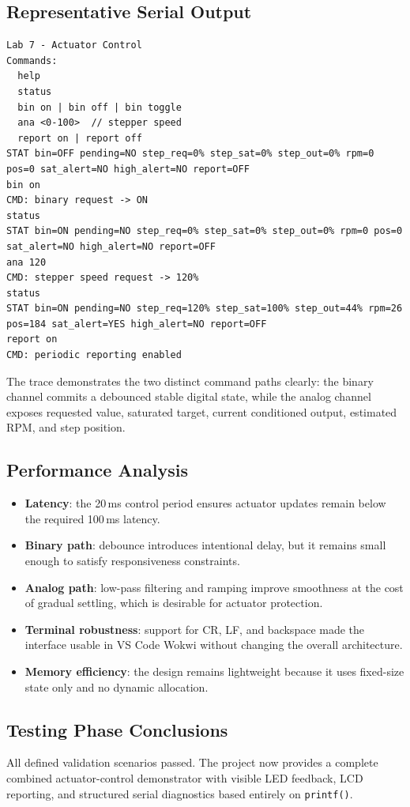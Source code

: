 \documentclass[12pt]{article}
\begin{document}
\subsection{Representative Serial Output}
\begin{verbatim}
Lab 7 - Actuator Control
Commands:
  help
  status
  bin on | bin off | bin toggle
  ana <0-100>  // stepper speed
  report on | report off
STAT bin=OFF pending=NO step_req=0% step_sat=0% step_out=0% rpm=0 pos=0 sat_alert=NO high_alert=NO report=OFF
bin on
CMD: binary request -> ON
status
STAT bin=ON pending=NO step_req=0% step_sat=0% step_out=0% rpm=0 pos=0 sat_alert=NO high_alert=NO report=OFF
ana 120
CMD: stepper speed request -> 120%
status
STAT bin=ON pending=NO step_req=120% step_sat=100% step_out=44% rpm=26 pos=184 sat_alert=YES high_alert=NO report=OFF
report on
CMD: periodic reporting enabled
\end{verbatim}

The trace demonstrates the two distinct command paths clearly: the binary channel commits a debounced stable digital state, while the analog channel exposes requested value, saturated target, current conditioned output, estimated RPM, and step position.

\subsection{Performance Analysis}
\begin{itemize}
    \item \textbf{Latency}: the 20\,ms control period ensures actuator updates remain below the required 100\,ms latency.
    \item \textbf{Binary path}: debounce introduces intentional delay, but it remains small enough to satisfy responsiveness constraints.
    \item \textbf{Analog path}: low-pass filtering and ramping improve smoothness at the cost of gradual settling, which is desirable for actuator protection.
    \item \textbf{Terminal robustness}: support for CR, LF, and backspace made the interface usable in VS Code Wokwi without changing the overall architecture.
    \item \textbf{Memory efficiency}: the design remains lightweight because it uses fixed-size state only and no dynamic allocation.
\end{itemize}

\subsection{Testing Phase Conclusions}
\hspace{0.8cm} All defined validation scenarios passed. The project now provides a complete combined actuator-control demonstrator with visible LED feedback, LCD reporting, and structured serial diagnostics based entirely on \texttt{printf()}.
\end{document}
